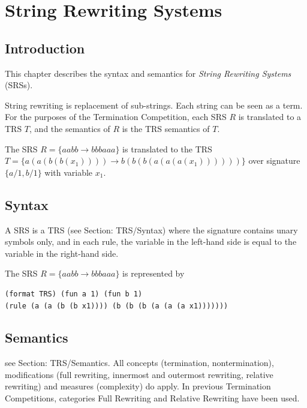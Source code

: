 \chapter{String Rewriting Systems}\label{chap:SRS}

\section{Introduction}


This chapter describes the syntax and semantics for \emph{String Rewriting Systems} (SRSs).

String rewriting is replacement of sub-strings.
Each string can be seen as a term.
For the purposes of the Termination Competition,
each SRS $R$ is translated to a TRS $T$,
and the semantics of $R$ is the TRS semantics of $T$.

\begin{example}
The SRS $R=\{aabb \to bbbaaa\}$
is translated to the TRS $T=\{a(a(b(b(x_1))))\to b(b(b(a(a(a(x_1))))))\}$
over signature $\{a/1, b/1\}$ with variable $x_1$.
\end{example}

\section{Syntax}

A SRS  is a TRS (see Section: TRS/Syntax) where
the signature contains unary symbols only,
and in  each rule, the variable in the left-hand side is equal to the variable in the right-hand side.

\begin{example}
The SRS $R=\{aabb \to bbbaaa\}$ is represented by
\begin{center}
\begin{verbatim}
(format TRS) (fun a 1) (fun b 1)
(rule (a (a (b (b x1)))) (b (b (b (a (a (a x1))))))) 
\end{verbatim}
\end{center}
\end{example}

\section{Semantics}

see Section: TRS/Semantics. All concepts (termination, nontermination),
modifications (full rewriting, innermost and outermost rewriting, relative rewriting)
and measures (complexity) do apply.
In previous Termination Competitions, categories Full Rewriting and Relative Rewriting have been used.

